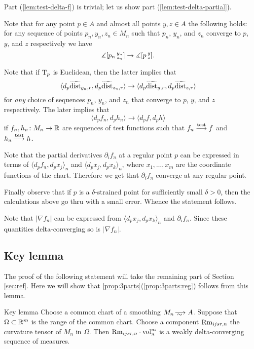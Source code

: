  Part (\ref{lem:test-delta-f}) is trivial; let us show part (\ref{lem:test-delta-partial}).

Note that for any point $p\in A$ and almost all points $y,z\in A$ the following holds:
for any sequence of points $p_n,y_n,z_n\in M_n$ such that $p_n$, $y_n$, and $z_n$ converge to $p$, $y$, and $z$ respectively we have
\[\measuredangle [p_n\,{}^{y_n}_{z_n}]\to \measuredangle [p\,{}^{y}_{z}].\]

Note that if $\mathrm{T}_p$ is Euclidean, then the latter implies that 
\[\langle d_p\widetilde{\operatorname{\rm dist}}_{y_n,r},d_p\widetilde{\operatorname{\rm dist}}_{z_n,r}\rangle\to \langle d_p\widetilde{\operatorname{\rm dist}}_{y,r},d_p\widetilde{\operatorname{\rm dist}}_{z,r}\rangle\]
for \emph{any} choice of sequences $p_n$, $y_n$, and $z_n$ that converge to $p$, $y$, and $z$ respectively.
The later implies that 
\[\langle d_pf_n,d_ph_n\rangle\to \langle d_pf,d_ph\rangle\]
if $f_n,h_n\colon M_n\to\mathbb{R}$ are sequences of test functions such that $f_n\stackrel{\tiny\rm test}{\longrightarrow} f$ and $h_n\stackrel{\tiny\rm test}{\longrightarrow} h$.

Note that the partial derivatives $\partial_if_n$ at a regular point $p$ can be expressed in terms of $\langle d_pf_n,d_px_j\rangle_n$ and $\langle d_px_j,d_px_k\rangle_n$, where $x_1,\dots,x_m$ are the coordinate functions of the chart.
Therefore we get that $\partial_if_n$ converge at any regular point.

Finally observe that if $p$ is a $\delta$-strained point for sufficiently small $\delta>0$,
then the calculations above go thru with a small error.
Whence the statement follows.

Note that $|\nabla f_n|$ can be expressed from $\langle d_px_j,d_px_k\rangle_n$ and $\partial_if_n$.
Since these quantities delta-converging so is $|\nabla f_n|$.
\qeds

\subsection{Key lemma}

The proof of the following statement will take the remaining part of Section \ref{sec:ref}.
Here we will show that \ref{prop:3parts}(\ref{prop:3parts:reg}) follows from this lemma.

\begin{thm}{Key lemma}\label{A^0}
Choose a common chart of a smoothing $M_n\smooths{} A$.
Suppose that $\Omega\subset \mathbb{R}^m$ is the range of the common chart.
Choose a component $\operatorname{\rm Rm}_{ijsr,n}$ the curvature tensor of $M_n$ in $\Omega$.
Then $\Rm_{ijsr,n}\cdot \vol^m_n$ is a weakly delta-converging sequence of measures.
\end{thm}

